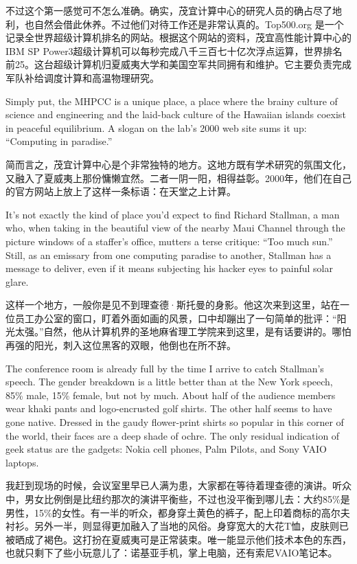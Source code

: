 \ifdefined\chs
不过这个第一感觉可不怎么准确。确实，茂宜计算中心的研究人员的确占尽了地利，也自然会借此休养。不过他们对待工作还是非常认真的。Top500.org 是一个记录全世界超级计算机排名的网站。根据这个网站的资料，茂宜高性能计算中心的IBM SP Power3超级计算机可以每秒完成八千三百七十亿次浮点运算，世界排名前25。这台超级计算机归夏威夷大学和美国空军共同拥有和维护。它主要负责完成军队补给调度计算和高温物理研究。
\fi

\ifdefined\eng
Simply put, the MHPCC is a unique place, a place where the brainy culture of science and engineering and the laid-back culture of the Hawaiian islands coexist in peaceful equilibrium. A slogan on the lab's 2000 web site sums it up: ``Computing in paradise.''
\fi

\ifdefined\chs
简而言之，茂宜计算中心是个非常独特的地方。这地方既有学术研究的氛围文化，又融入了夏威夷上那份慵懒宜然。二者一阴一阳，相得益彰。2000年，他们在自己的官方网站上放上了这样一条标语：在天堂之上计算。
\fi

\ifdefined\eng
It's not exactly the kind of place you'd expect to find Richard Stallman, a man who, when taking in the beautiful view of the nearby Maui Channel through the picture windows of a staffer's office, mutters a terse critique: ``Too much sun.'' Still, as an emissary from one computing paradise to another, Stallman has a message to deliver, even if it means subjecting his hacker eyes to painful solar glare.
\fi

\ifdefined\chs
这样一个地方，一般你是见不到理查德·斯托曼的身影。他这次来到这里，站在一位员工办公室的窗口，盯着外面如画的风景，口中却蹦出了一句简单的批评：“阳光太强。”自然，他从计算机界的圣地麻省理工学院来到这里，是有话要讲的。哪怕再强的阳光，刺入这位黑客的双眼，他倒也在所不辞。
\fi

\ifdefined\eng
The conference room is already full by the time I arrive to catch Stallman's speech. The gender breakdown is a little better than at the New York speech, 85\% male, 15\% female, but not by much. About half of the audience members wear khaki pants and logo-encrusted golf shirts. The other half seems to have gone native. Dressed in the gaudy flower-print shirts so popular in this corner of the world, their faces are a deep shade of ochre. The only residual indication of geek status are the gadgets: Nokia cell phones, Palm Pilots, and Sony VAIO laptops.
\fi

\ifdefined\chs
我赶到现场的时候，会议室里早已人满为患，大家都在等待着理查德的演讲。听众中，男女比例倒是比纽约那次的演讲平衡些，不过也没平衡到哪儿去：大约85\%是男性，15\%的女性。有一半的听众，都身穿土黄色的裤子，配上印着商标的高尔夫衬衫。另外一半，则显得更加融入了当地的风俗。身穿宽大的大花T恤，皮肤则已被晒成了褐色。这打扮在夏威夷可是正常装束。唯一能显示他们技术本色的东西，也就只剩下了些小玩意儿了：诺基亚手机，掌上电脑，还有索尼VAIO笔记本。
\fi

